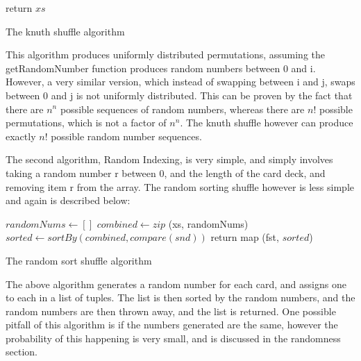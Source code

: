 \vspace{0.3cm}

\begin{algorithm}[H]
    \BlankLine{}
    return $xs$\;
\caption{The knuth shuffle algorithm}
\end{algorithm}

\vspace{0.3cm}

This algorithm produces uniformly distributed permutations, assuming the
getRandomNumber function produces random numbers between 0 and i. However,
a very similar version, which instead of swapping between i and j, swaps
between 0 and j is not uniformly distributed. This can be proven by
the fact that there are $n^n$ possible sequences of random numbers, whereas
there are ${n!}$ possible permutations, which is not a factor of $n^n$.
The knuth shuffle however can produce exactly ${n!}$ possible random number
sequences. \parencite{website:rici2015}


The second algorithm, Random Indexing, is very simple, and simply involves 
taking a random number r between 0, and the length of the card deck, and 
removing item r from the array. The random sorting shuffle however is less 
simple and again is described below:

\vspace{0.3cm}

\begin{algorithm}[H]
    \BlankLine{}
    $randomNums \leftarrow []$\;
    $combined \leftarrow zip$ (xs, randomNums)\;
    $sorted \leftarrow sortBy ( combined, compare (snd))$\;
    return map (fst, $sorted$)\;
\caption{The random sort shuffle algorithm}
\end{algorithm}

\vspace{0.3cm}

The above algorithm generates a random number for each card, and assigns
one to each in a list of tuples. The list is then sorted by the random numbers,
and the random numbers are then thrown away, and the list is returned. One
possible pitfall of this algorithm is if the numbers generated are the same,
however the probability of this happening is very small, and is discussed
in the randomness section.

